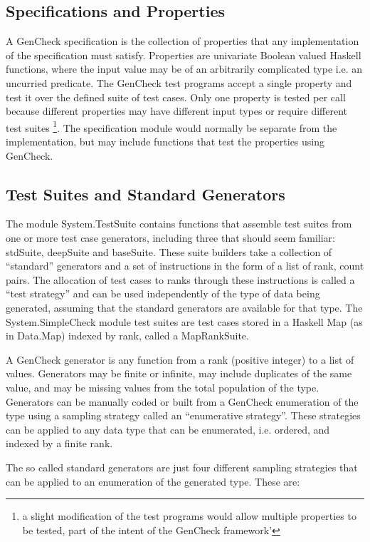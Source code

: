 \subsection{Specifications and Properties}
A GenCheck specification is the collection of properties
that any implementation of the specification must satisfy.
Properties are univariate Boolean valued Haskell functions,
where the input value may be of an arbitrarily complicated type 
i.e. an uncurried predicate. The GenCheck test programs accept 
a single property and test it over the defined suite of test cases.
Only one property is tested per call because different properties 
may have different input types or require different test suites
\footnote{a slight modification of the test programs would 
allow multiple properties to be tested, part of the intent 
of the GenCheck framework'}.
The specification module would normally be separate from the implementation,
but may include functions that test the properties using GenCheck.



\subsection{Test Suites and Standard Generators}
The module System.TestSuite contains functions that assemble test suites 
from one or more test case generators, including three that should seem familiar: 
stdSuite, deepSuite and baseSuite.  These suite builders take a collection of 
``standard'' generators and a set of instructions in the form of  a list of rank, count pairs.  
The allocation of test cases to ranks through these instructions is called a ``test strategy'' 
and can be used independently of the type of data being generated, 
assuming that the standard generators are available for that type.
The System.SimpleCheck module test suites are test cases stored in 
a Haskell Map (as in Data.Map) indexed by rank, called a MapRankSuite.

A GenCheck generator is any function from a rank (positive integer) to a list of values.
Generators may be finite or infinite, may include duplicates of the same value,
and may be missing values from the total population of the type.  Generators
can be manually coded or built from a GenCheck enumeration of the type using
a sampling strategy called an ``enumerative strategy''.  These strategies can be
applied to any data type that can be enumerated, i.e. ordered, and indexed by a finite rank.

The so called standard generators are just four different sampling strategies
that can be applied to an enumeration of the generated type.  These are:

